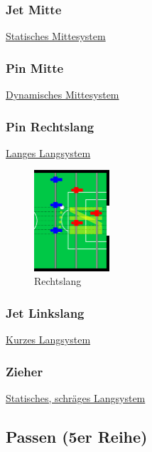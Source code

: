 \subsubsection{Jet Mitte}
\href{http://ungeblogtkickern.blogspot.de/2015/06/system-jet-mitte.htmli}{
Statisches Mittesystem}
\subsubsection{Pin Mitte}
\href{http://ungeblogtkickern.blogspot.de/2015/08/system-pin-mitte.html}{
Dynamisches Mittesystem}
\subsubsection{Pin Rechtslang}
\href{http://ungeblogtkickern.blogspot.de/2015/07/system-pin-rechtslang.html}{
Langes Langsystem}

\begin{figure}
\centering 
\includegraphics[width=0.25\textwidth]{img/schuss3er_lang.png} 
\caption{Rechtslang} 
\label{fig:rechtslang} 
\end{figure}

\subsubsection{Jet Linkslang}
\href{http://ungeblogtkickern.blogspot.de/2015/07/system-jet-linkslang.html}{
Kurzes Langsystem}
\subsubsection{Zieher}
\href{http://ungeblogtkickern.blogspot.de/2015/09/system-zieher.html}{
Statisches, schräges Langsystem}

 
\subsection{Passen (5er Reihe)}
\label{taktik:offensive:passen}

